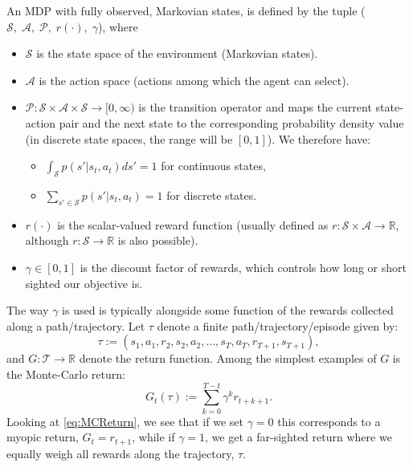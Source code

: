 \documentclass{report}
\newcommand{\reals}{\mbox{\(\mathbb R\)}}
\numberwithin{equation}{section}
\numberwithin{figure}{section}
\numberwithin{table}{section}
\numberwithin{algorithm}{section}
\begin{document}
An MDP with fully observed, Markovian states, is defined by the tuple 
($\mathcal{S},\; \mathcal{A},\; \mathcal{P},\; r(\cdot),\; \gamma$), where
\begin{itemize}
  \item $\mathcal{S}$ is the state space of the environment 
    (Markovian states).
  \item $\mathcal{A}$ is the action space (actions among which 
    the agent can select).
  \item $\mathcal{P}:\mathcal{S}\times \mathcal{A}\times \mathcal{S}\rightarrow [0, \infty)$ 
    is the transition operator and maps 
    the current state-action pair and the next state to the 
    corresponding probability density value (in discrete state spaces, 
    the range will be $[0, 1]$). We therefore have:
    \begin{itemize}
      \item $\int_{\mathcal{S}}p(s'|s_t, a_t)ds'=1$ for continuous states,
      \item $\sum_{s'\in\mathcal{S}}p(s'|s_t, a_t)=1$ for discrete states.
    \end{itemize}
     
  \item $r(\cdot)$ is the scalar-valued reward function 
    (usually defined as $r:\mathcal{S}\times \mathcal{A}\rightarrow \reals$, 
    although $r:\mathcal{S}\rightarrow \reals$ is also possible).
  \item $\gamma\in [0, 1]$ is the discount factor of rewards, which controls 
    how long or short sighted our objective is.
\end{itemize} 

The way $\gamma$ is used is typically alongside some function of 
the rewards collected along a path/trajectory. Let $\tau$ denote a 
finite path/trajectory/episode given by:
\begin{equation}
  \tau:=(s_1, a_1, r_2, s_2, a_2, \ldots, s_T, a_T, r_{T+1}, s_{T+1}),\label{eq:tau} 
\end{equation} 
and $G:\mathcal{T}\rightarrow \reals$ denote the return 
function. Among the simplest examples of $G$ is the Monte-Carlo 
return:
\begin{equation}
  G_t(\tau):=\sum_{k=0}^{T-t}\gamma^kr_{t+k+1}.\label{eq:MCReturn}
\end{equation}
Looking at \eqref{eq:MCReturn}, we see that if we set $\gamma=0$ 
this corresponds to a myopic return, $G_t=r_{t+1}$, while if 
$\gamma=1$, we get a far-sighted return where we equally weigh 
all rewards along the trajectory, $\tau$.
\end{document}
